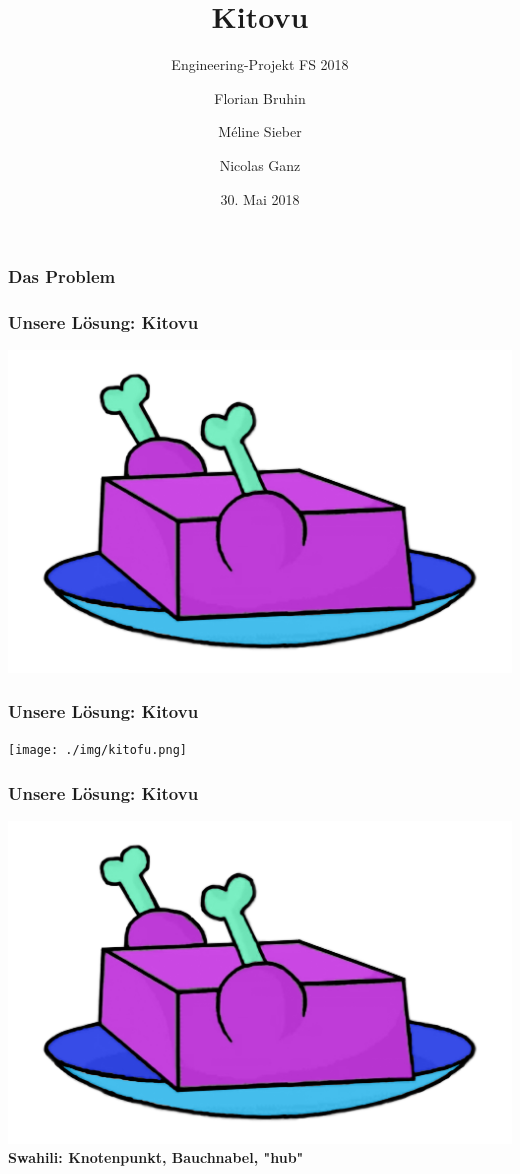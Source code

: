 \documentclass{beamer}
\title{Kitovu %
}
\subtitle{Engineering-Projekt FS 2018}
\author{Florian Bruhin \and Méline Sieber \and Nicolas Ganz}
\institute{HSR Hochschule für Technik Rapperswil}
\date{30. Mai 2018}
\begin{document}
	
	\begin{frame}
	\frametitle{Das Problem}
	\end{frame}
	
	\begin{frame}
	\frametitle{Unsere Lösung: Kitovu}
	\begin{center}
		\includegraphics[width=0.5\linewidth]{../../img/logo/kitovu.jpg}
	\end{center}
	\end{frame}

	\begin{frame}
		\frametitle{Unsere Lösung: Kitovu}
		\begin{center}
			\texttt{[image: ./img/kitofu.png]}
		\end{center}
	\end{frame}

		\begin{frame}
			\frametitle{Unsere Lösung: Kitovu}
			\begin{center}
				\includegraphics[width=0.5\linewidth]{../../img/logo/kitovu.jpg}\newline
				\textbf{Swahili: Knotenpunkt, Bauchnabel, "hub"}
			\end{center}
		\end{frame}
	
\end{document}
